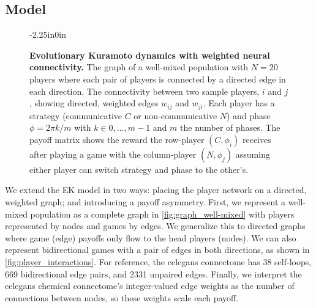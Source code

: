 \documentclass[10pt,letterpaper]{article}
\begin{document}
\subsection{Model}
\begin{figure}
\begin{adjustwidth}{-2.25in}{0in}
  \centering
  \begin{subcaptiongroup}
      {\label{fig:payoff_matrix}\captiontext*{}}{%
      {\label{fig:player_interactions}\captiontext*{}}{%
      {\label{fig:graph_well-mixed}\captiontext*{}}{%
    {}%
  }}}
  \end{subcaptiongroup}
  \caption{
    \textbf{
      Evolutionary Kuramoto dynamics with weighted neural connectivity.
    }
    The graph of a well-mixed population with $N=20$ players
    where each pair of players is connected by a directed edge in each direction.
    The connectivity between two sample players, $i$ and $j$,
    showing directed, weighted edges $w_{ij}$ and $w_{ji}$.
    Each player has a strategy (communicative $C$ or non-communicative $N$)
    and phase $\phi = 2\pi k/m$ with $k \in 0,\ldots,m-1$
    and $m$ the number of phases.
    The payoff matrix shows the reward the row-player $(C, \phi_i)$
    receives after playing a game with the column-player $(N, \phi_j)$
    assuming either player can switch strategy and phase to the other's.
  }\label{fig:connectivity}
\end{adjustwidth}
\end{figure}

We extend the EK model in two ways:
placing the player network on a directed, weighted graph;
and introducing a payoff asymmetry.
First, we represent a well-mixed population
as a complete graph in \cref{fig:graph_well-mixed}
with players represented by nodes and games by edges.
We generalize this to directed graphs
where game (edge) payoffs only flow to the head players (nodes).
We can also represent bidirectional games with
a pair of edges in both directions,
as shown in \cref{fig:player_interactions}.
For reference, the \gls{celegans} connectome
has \num{38} self-loops, \num{669} bidirectional edge pairs,
and \num{2331} unpaired edges.
Finally, we interpret the \gls{celegans} chemical connectome's
integer-valued edge weights
as the number of connections between nodes,
so these weights scale each payoff.
\end{document}

